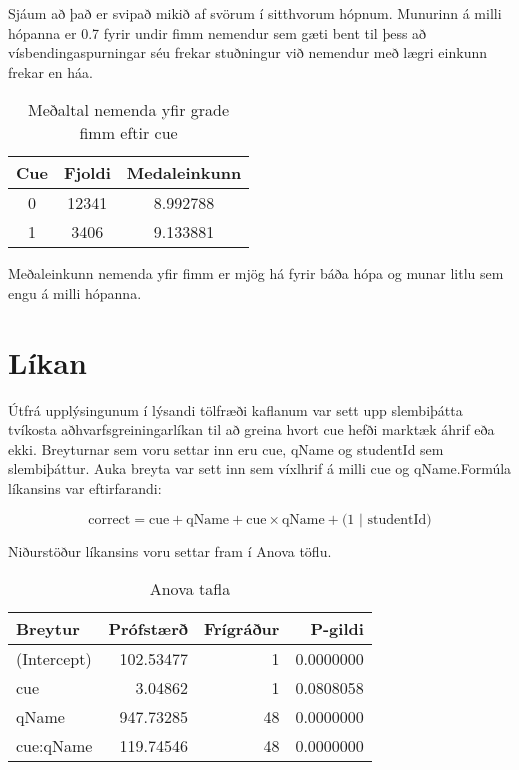 \documentclass[
  10pt,
]{article}
\begin{document}
Sjáum að það er svipað mikið af svörum í sitthvorum hópnum. Munurinn á milli hópanna er 0.7 fyrir undir fimm nemendur sem gæti bent til þess að vísbendingaspurningar séu frekar stuðningur við nemendur með lægri einkunn frekar en háa.

\begin{table}[!h]

\caption{\label{tab:unnamed-chunk-8}\label{tab:str2} Meðaltal nemenda yfir grade fimm eftir cue}
\centering
\begin{tabular}[t]{ccc}
\toprule
\textbf{Cue} & \textbf{Fjoldi} & \textbf{Medaleinkunn}\\
\midrule
0 & 12341 & 8.992788\\
1 & 3406 & 9.133881\\
\bottomrule
\end{tabular}
\end{table}

Meðaleinkunn nemenda yfir fimm er mjög há fyrir báða hópa og munar litlu sem engu á milli hópanna.

\newpage

\hypertarget{luxedkan}{%
\section{Líkan}\label{luxedkan}}

Útfrá upplýsingunum í lýsandi tölfræði kaflanum var sett upp slembiþátta tvíkosta aðhvarfsgreiningarlíkan til að greina hvort cue hefði marktæk áhrif eða ekki. Breyturnar sem voru settar inn eru cue, qName og studentId sem slembiþáttur. Auka breyta var sett inn sem víxlhrif á milli cue og qName.\newline Formúla líkansins var eftirfarandi:

\[\mbox{correct} =  \mbox{cue} + \mbox{qName} + \mbox{cue} \times \mbox{qName} + \mbox{(1 | studentId)}\]

Niðurstöður líkansins voru settar fram í Anova töflu.

\begin{table}[!h]

\caption{\label{tab:unnamed-chunk-9}\label{tab:str2} Anova tafla}
\centering
\begin{tabular}[t]{lrrr}
\toprule
\textbf{Breytur} & \textbf{Prófstærð} & \textbf{Frígráður} & \textbf{P-gildi}\\
\midrule
(Intercept) & 102.53477 & 1 & 0.0000000\\
cue & 3.04862 & 1 & 0.0808058\\
qName & 947.73285 & 48 & 0.0000000\\
cue:qName & 119.74546 & 48 & 0.0000000\\
\bottomrule
\end{tabular}
\end{table}
\end{document}
